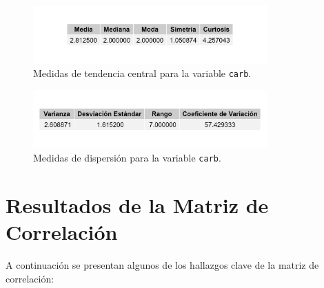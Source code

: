 \documentclass{article}
\begin{document}
\begin{enumerate}
          \begin{figure}[H]
              \centering
              \includegraphics[width=0.8\textwidth]{MTC/carb_central.png}
              \caption{Medidas de tendencia central para la variable \texttt{carb}.}
              \label{fig:carb_central}
          \end{figure}

          \begin{figure}[H]
              \centering
              \includegraphics[width=0.8\textwidth]{MTC/carb_dispersion.png}
              \caption{Medidas de dispersión para la variable \texttt{carb}.}
              \label{fig:carb_dispersion}
          \end{figure}

\end{enumerate}

\section{Resultados de la Matriz de Correlación}
A continuación se presentan algunos de los hallazgos clave de la matriz de correlación:
\end{document}
